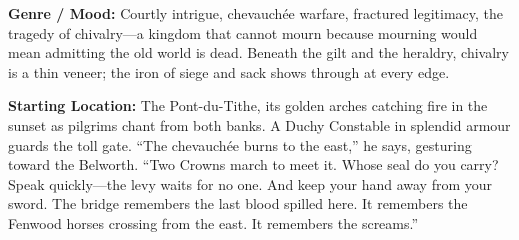 \noindent\textbf{Genre / Mood:} Courtly intrigue, chevauchée warfare, fractured legitimacy, the tragedy of chivalry---a kingdom that cannot mourn because mourning would mean admitting the old world is dead. Beneath the gilt and the heraldry, chivalry is a thin veneer; the iron of siege and sack shows through at every edge.

\noindent\textbf{Starting Location:} The Pont-du-Tithe, its golden arches catching fire in the sunset as pilgrims chant from both banks. A Duchy Constable in splendid armour guards the toll gate. ``The chevauchée burns to the east,'' he says, gesturing toward the Belworth. ``Two Crowns march to meet it. Whose seal do you carry? Speak quickly---the levy waits for no one. And keep your hand away from your sword. The bridge remembers the last blood spilled here. It remembers the Fenwood horses crossing from the east. It remembers the screams.''

